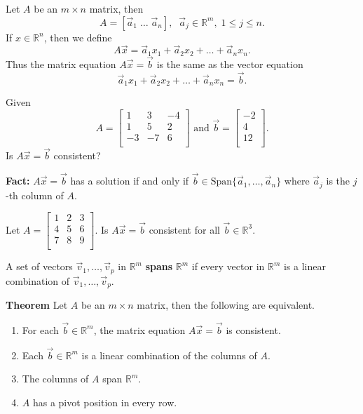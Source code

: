 \newpage

Let $A$ be an $m \times n$ matrix, then $$A = [ \vec{a}_1\; \dots \; \vec{a}_n], \; \; \vec{a}_j \in \mathbb{R}^m,\; 1\leq j \leq n.$$  
If $x \in \mathbb{R}^n$, then we define $$A \vec{x} = \vec{a}_1 x_1 + \vec{a}_2 x_2 +\dots + \vec{a}_n x_n.$$ Thus the matrix equation $A\vec{x} =\vec{b}$ is the same as the vector equation $$\vec{a}_1 x_1 + \vec{a}_2 x_2 +\dots + \vec{a}_n x_n=\vec{b}.$$


\begin{enumerate}

\Problem Given $$A=\begin{bmatrix}
1 & 3 & -4\\
1 & 5 & 2\\
-3 & -7 & 6\\
\end{bmatrix}\text{  and }\vec{b}=\begin{bmatrix} -2\\ 4 \\ 12\\ \end{bmatrix}.$$ Is $A\vec{x} =\vec{b}$ consistent?

\newpage

{\bf Fact:} $A\vec{x} =\vec{b}$ has a solution if and only if $\vec{b} \in \text{Span}\{\vec{a}_1,\dots, \vec{a}_n\}$ where $\vec{a}_j$ is the $j$-th column of $A$.

\Problem Let $A=\begin{bmatrix} 1 & 2 & 3 \\ 4 & 5 & 6\\ 7 & 8 & 9\\ \end{bmatrix}$. Is $A\vec{x} =\vec{b}$ consistent for all $\vec{b} \in \mathbb{R}^3$.

\vfill

\begin{defn}
A set of vectors $\vec{v}_1, \dots, \vec{v}_p$ in $\mathbb{R}^m$ {\bf spans} $\mathbb{R}^m$ if every vector in $\mathbb{R}^m$ is a linear combination of $\vec{v}_1, \dots, \vec{v}_p$.
\end{defn}

\newpage

{\bf Theorem} Let $A$ be an $m \times n$ matrix, then the following are equivalent.
\begin{enumerate}
\item For each $\vec{b} \in \mathbb{R}^m$, the matrix equation $A \vec{x} =\vec{b}$ is consistent.
\item Each $\vec{b} \in \mathbb{R}^m$ is a linear combination of the columns of $A$.
\item The columns of $A$ span $\mathbb{R}^m$.
\item $A$ has a pivot position in every row.
\end{enumerate}


\end{enumerate}
